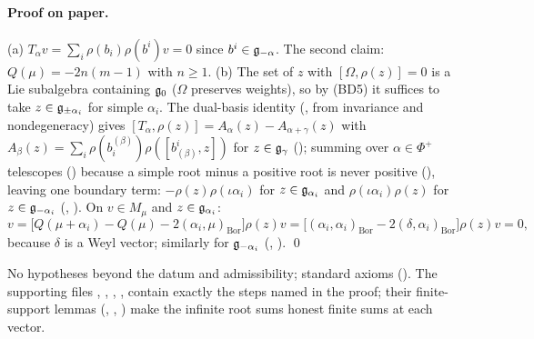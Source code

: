 \paragraph{Proof on paper.}  (a) $T_\alpha v=\sum_i\rho(b_i)\rho(b^i)v=0$ since $b^i\in\mathfrak{g}_{-\alpha}$.  The second claim:
$Q(\mu)=-2n(m-1)$ with $n\ge1$.  (b) The set of $z$ with $[\Omega,\rho(z)]=0$ is a Lie subalgebra containing $\mathfrak{g}_0$ ($\Omega$ preserves
weights), so by (BD5) it suffices to take $z\in\mathfrak{g}_{\pm\alpha_i}$ for simple $\alpha_i$.  The dual-basis identity
(, from invariance and nondegeneracy) gives
$[T_\alpha,\rho(z)]=A_\alpha(z)-A_{\alpha+\gamma}(z)$ with $A_\beta(z)=\sum_i\rho(b_i^{(\beta)})\rho([b^{i}_{(\beta)},z])$ for $z\in\mathfrak{g}_\gamma$
(); summing over $\alpha\in\Phi^+$ telescopes () because
a simple root minus a positive root is never positive (), leaving one boundary term:
$-\rho(z)\rho(\iota\alpha_i)$ for $z\in\mathfrak{g}_{\alpha_i}$ and $\rho(\iota\alpha_i)\rho(z)$ for $z\in\mathfrak{g}_{-\alpha_i}$
(, ).  On $v\in M_\mu$ and $z\in\mathfrak{g}_{\alpha_i}$:
\begin{equation*}
  [\Omega,\rho(z)]v=\bigl[Q(\mu+\alpha_i)-Q(\mu)-2(\alpha_i,\mu)_{\mathrm{Bor}}\bigr]\rho(z)v
  =\bigl[(\alpha_i,\alpha_i)_{\mathrm{Bor}}-2(\delta,\alpha_i)_{\mathrm{Bor}}\bigr]\rho(z)v=0,
\end{equation*}
because $\delta$ is a Weyl vector; similarly for $\mathfrak{g}_{-\alpha_i}$ (,
). \qed
\begin{status}No hypotheses beyond the datum and admissibility; standard axioms ().
The supporting files , , ,
,  contain exactly the steps named in the proof; their finite-support
lemmas (, ,
) make the infinite root sums honest finite sums at each vector.\end{status}

